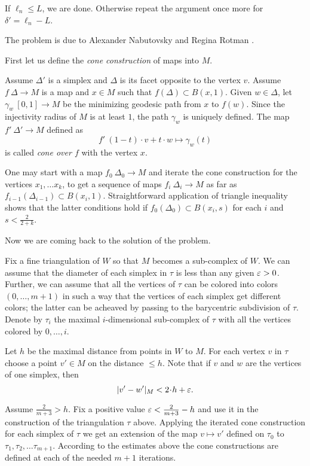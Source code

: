 If $\ell_n\le L$, we are done.
Otherwise repeat the argument once more for $\delta'=\ell_n-L$.
\qeds

The problem is due to 
Alexander Nabutovsky 
and Regina Rotman \cite[see][]{nabutovsky-rotman}.


First let us define the {}\emph{cone construction} of maps into $M$.

Assume $\Delta'$ is a simplex and $\Delta$ is its facet opposite to the vertex $v$.
Assume $f\:\Delta\to M$ is a map and $x\in M$ such that $f(\Delta)\subset B(x,1)$.
Given $w\in \Delta$, let $\gamma_w\:[0,1]\to M$ be the minimizing geodesic path from $x$ to  $f(w)$.
Since the injectivity radius of $M$ is at least $1$, the path $\gamma_w$ is uniquely defined.
The map $f'\:\Delta'\to M$ defined as 
\[f'\:(1-t)\cdot v+t\cdot w\mapsto \gamma_w(t)\] 
is called {}\emph{cone over $f$} with the vertex $x$. 

One may start with a map $f_0\:\Delta_0\to M$ and iterate the cone construction for the vertices $x_1,\dots x_k$,
to get a sequence of maps $f_i\:\Delta_i\to M$
as far as $f_{i-1}(\Delta_{i-1})\subset B(x_i,1)$.
Straightforward application of triangle inequality 
shows that the latter conditions hold if 
$f_0(\Delta_0)\subset B(x_i,s)$ for each $i$ and $s<\tfrac2{2+k}$.

\medskip

Now we are coming back to the solution of the problem.

Fix a fine triangulation of $W$ so that $M$ becomes a sub-complex of $W$.
We can assume that the diameter of each simplex in $\tau$ is less than any given
$\varepsilon>0$.
Further, we can assume that all the vertices of $\tau$ can be colored into colors $(0,\dots, m+1)$
in such a way that the vertices of each simplex 
get different colors;
the latter can be acheaved by passing to the barycentric subdivision of $\tau$.
Denote by $\tau_i$ the maximal $i$-dimensional sub-complex of $\tau$ 
with all the vertices colored by $0,\dots, i$.

Let $h$ be the maximal distance from points in $W$ to $M$.
For each vertex $v$ in $\tau$ 
choose a point $v'\in M$ on the distance $\le h$.
Note that 
if $v$ and $w$ are the vertices of one simplex,
then
\[|v'-w'|_M<2\cdot h+\eps.\]

Assume $\tfrac{2}{m+3}>h$.
Fix a positive value $\varepsilon<\tfrac{2}{m+3}-h$ and use it in the construction of the triangulation $\tau$ above.
Applying the iterated cone construction for each simplex of $\tau$
we get an extension of the map $v\mapsto v'$ defined on $\tau_0$ to $\tau_1,\tau_2,\dots\tau_{m+1}$.
According to the estimates above the cone constructions are defined at each of the needed $m+1$ iterations.

